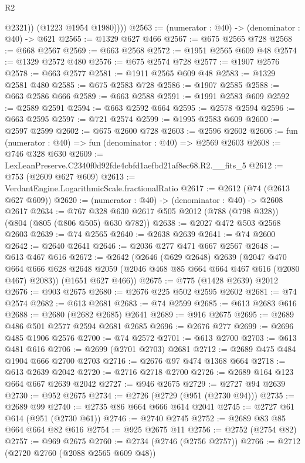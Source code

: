 \begin{lexlean}{R2}
\begin{coremodule}
              @2321))
          (@1223 @1954 @1980))))
@2563 := (numerator : @40) -> (denominator : @40) -> @621
@2565 := @1329 @627 @466
@2567 := @675 @2565 @728
@2568 := @668 @2567
@2569 := @663 @2568
@2572 := @1951 @2565 @609 @48
@2574 := @1329 @2572 @480
@2576 := @675 @2574 @728
@2577 := @1907 @2576
@2578 := @663 @2577
@2581 := @1911 @2565 @609 @48
@2583 := @1329 @2581 @480
@2585 := @675 @2583 @728
@2586 := @1907 @2585
@2588 := @663 @2586 @666
@2589 := @663 @2588
@2591 := @1991 @2583 @609
@2592 := @2589 @2591
@2594 := @663 @2592 @664
@2595 := @2578 @2594
@2596 := @663 @2595
@2597 := @721 @2574
@2599 := @1995 @2583 @609
@2600 := @2597 @2599
@2602 := @675 @2600 @728
@2603 := @2596 @2602
@2606 := fun (numerator : @40) => fun (denominator : @40) => @2569 @2603
@2608 := @746 @328 @630
@2609 := LexLeanPreserve.C2340f0d92fde4cbfd1aefbd21af8ec68.R2.__fits_5
@2612 := @753 (@2609 @627 @609)
@2613 := VerdantEngine.LogarithmicScale.fractionalRatio
@2617 := @2612 (@74 (@2613 @627 @609))
@2620 := (numerator : @40) -> (denominator : @40) -> @2608 @2617
@2634 := @767 @328 @630 @2617 @505 @2012 (@788 (@798 @328)) (@804 (@805 (@806 @505) @630 @782))
@2638 := @2027 @472 @503 @2568 @2603
@2639 := @74 @2565
@2640 := @2638 @2639
@2641 := @74 @2600
@2642 := @2640 @2641
@2646 := @2036 @277 @471 @667 @2567
@2648 := @613 @467 @616
@2672 := @2642
    (@2646
      (@629 @2648)
      @2639
      (@2047
        @470
        @664
        @666
        @628
        @2648
        @2059
        (@2046 @468 @85 @664 @664 @467 @616 (@2080 @467) @2083))
      (@1651 @627 @466))
@2675 := @775 (@1428 @2639) @2012
@2676 := @903 @2675
@2680 := @2676 @225 @502 @2595 @2602
@2681 := @74 @2574
@2682 := @613 @2681
@2683 := @74 @2599
@2685 := @613 @2683 @616
@2688 := @2680 (@2682 @2685) @2641
@2689 := @916 @2675
@2695 := @2689 @486 @501 @2577 @2594 @2681 @2685
@2696 := @2676 @277
@2699 := @2696 @485 @1906 @2576
@2700 := @74 @2572
@2701 := @613 @2700
@2703 := @613 @481 @616
@2706 := @2699 (@2701 @2703) @2681
@2712 := @2689 @475 @484 @1904 @666 @2700 @2703
@2716 := @2676 @97 @474 @1368 @664
@2718 := @613 @2639 @2042
@2720 := @2716 @2718 @2700
@2726 := @2689 @164 @123 @664 @667 @2639 @2042
@2727 := @946 @2675
@2729 := @2727 @94 @2639
@2730 := @952 @2675
@2734 := @2726 (@2729 (@951 (@2730 @94)))
@2735 := @2689 @99
@2740 := @2735 @86 @664 @666 @614 @2041
@2745 := @2727 @61 @614 (@951 (@2730 @61))
@2746 := @2740 @2745
@2752 := @2689 @83 @85 @664 @664 @82 @616
@2754 := @925 @2675 @11
@2756 := @2752 (@2754 @82)
@2757 := @969 @2675
@2760 := @2734 (@2746 (@2756 @2757))
@2766 := @2712 (@2720 @2760 (@2088 @2565 @609 @48))

\end{coremodule}
\end{lexlean}
